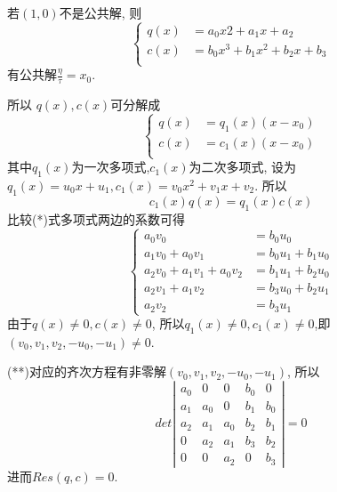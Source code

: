 \documentclass[UTF8]{book}
\begin{document}
			
			若$ (1,0) $不是公共解, 则
			\begin{equation*}
			  \left\{
			   \begin{aligned}
			   q(x) &=a_{0}x{2}+a_{1}x+a_{2} \\
			  c(x) &=b_{0}x^{3}+b_{1}x^{2}+b_{2}x+b_{3}\\
			   \end{aligned}
			   \right.
			\end{equation*}
			有公共解$\frac{\eta}{\tau}=x_{0}$.
			
			  所以 $ q(x),c(x) $可分解成
			  \begin{equation*}
			  \left\{
			   \begin{aligned}
			   q(x) &=q_{1}(x)(x-x_{0}) \\
			  c(x) &=c_{1}(x)(x-x_{0})\\
			   \end{aligned}
			   \right.
			   \end{equation*}
			   其中$q_{1}(x)$为一次多项式,$ c_{1}(x)$为二次多项式, 设为$q_{1}(x)=u_{0}x+u_{1}, c_{1}(x)=v_{0}x^{2}+v_{1}x+v_{2}$. 所以
			   \begin{equation*}
			   c_{1}(x)q(x)=q_{1}(x)c(x) \tag{$*$}
			 \end{equation*}
			比较(*)式多项式两边的系数可得
			\begin{equation*}
			  \left\{
			   \begin{aligned}
			   a_{0}v_{0} &=b_{0}u_{0} \\
			  a_{1}v_{0}+a_{0}v_{1} &= b_{0}u_{1}+b_{1}u_{0}\\
			    a_{2}v_{0}+a_{1}v_{1}+a_{0}v_{2} &= b_{1}u_{1}+b_{2}u_{0}\\
			    a_{2}v_{1}+a_{1}v_{2} &= b_{3}u_{0}+b_{2}u_{1}\\
			    a_{2}v_{2} &=b_{3}u_{1}
			   \end{aligned}
			   \right. \tag{$**$}
			   \end{equation*}
			   由于$q(x)\neq0,c(x)\neq0$, 所以$q_{1}(x)\neq0,c_{1}(x)\neq0$,即$(v_{0},v_{1},v_{2},-u_{0},-u_{1})\neq0$.
			
			
			   (**)对应的齐次方程有非零解$(v_{0},v_{1},v_{2},-u_{0},-u_{1})$, 所以\[
			det\left|\begin{array}{cccccc}
			  a_{0} &  0 & 0&b_{0} &0\\
			    a_{1} & a_{0} &  0 & b_{1}& b_{0} \\
			    a_{2} & a_{1} &a_{0} &  b_{2} & b_{1}\\
			    0 &  a_{2} & a_{1}& b_{3} &b_{2}\\
			    0 &  0 &  a_{2} & 0& b_{3}
			\end{array}\right|=0
			\]
			进而$ Res(q,c)=0 $.
			
\end{document}

